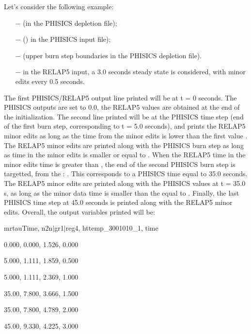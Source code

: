 Let's consider the following example:
\begin{enumerate}
\item [$-$]   (in the PHISICS depletion file);
\item [$-$]  () in the PHISICS input file);
\item [$-$]  (upper burn step boundaries in the PHISICS depletion file).
\item [$-$]in the RELAP5 input, a 3.0 seconds steady state is considered, with minor edits every 0.5 seconds.
\end{enumerate}
The first PHISICS/RELAP5 output line printed will be at t = 0 seconds. The PHISICS outputs are set to 0.0, the RELAP5 values are obtained at the end of the initialization.
The second line printed will be at the PHISICS time step  (end of the first burn step, corresponding to t = 5.0 seconds),
and prints the RELAP5 minor edits as long as the time from the minor edits is lower than the first  value .
The RELAP5 minor edits are printed along with the PHISICS burn step  as long as time in the minor edits is smaller or equal to .
When the RELAP5 time in the minor edits time is greater than , the end of the second PHISICS burn step is targetted, from the
: . This corresponds to a PHISICS time equal to 35.0 seconds. The RELAP5 minor edits are printed along with the PHISICS values at t = 35.0 s,
as long as the minor data time is smaller than the  equal to .
Finally, the last PHISICS time step at 45.0 seconds is printed along with the RELAP5 minor edits.
Overall, the output variables printed will be:

mrtauTime, n2n$\vert$gr1$\vert$reg4, httemp\_3001010\_1, time

0.000, 0.000, 1.526, 0.000

5.000, 1.111, 1.859, 0.500

5.000, 1.111, 2.369, 1.000

35.00, 7.800, 3.666, 1.500

35.00, 7.800, 4.789, 2.000

45.00, 9.330, 4.225, 3.000

